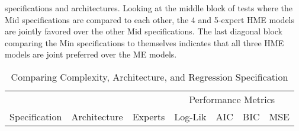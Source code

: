 \documentclass[12pt]{article}
\theoremstyle{definition}
\begin{document}
specifications and architectures. Looking at the middle block of tests where the Mid specifications are compared to each other, the 4 and 5-expert HME models are jointly favored over the other Mid specifications. The last diagonal block comparing the Min specifications to themselves indicates that all three HME models are joint preferred over the ME models. 

\begin{table}[b!] \centering
  \caption{Comparing Complexity, Architecture, and Regression Specification}
  \begin{threeparttable}
    {\footnotesize
    \begin{tabular}[r]{l l l r r r r}
  \cmidrule{1-7}
         &       &         &  \multicolumn{4}{c}{Performance Metrics} \\ 
   \cmidrule(l){4-7}
Specification & Architecture  & Experts & Log-Lik & AIC    & BIC    & MSE   \\ 
  \cmidrule{1-7}


\end{tabular}}
\end{threeparttable}
\end{table}
\end{document}
